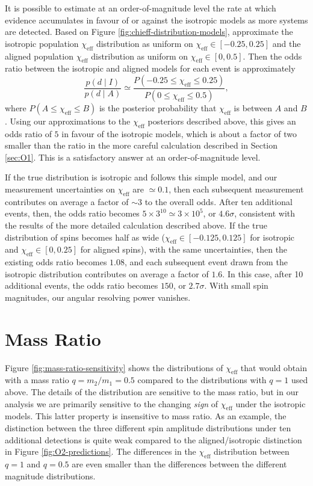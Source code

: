 \documentclass[modern,linenumbers]{aastex61}
\newcommand{\chieff}{\chi_\mathrm{eff}}
\begin{document}
It is possible to estimate at an order-of-magnitude level the rate at
which evidence accumulates in favour of or against the isotropic
models as more systems are detected.  Based on Figure
\ref{fig:chieff-distribution-models}, approximate the isotropic
population $\chieff$ distribution as uniform on
$\chieff \in \left[ -0.25, 0.25 \right]$ and the aligned population
$\chieff$ distribution as uniform on
$\chieff \in \left[0, 0.5\right]$.  Then the odds ratio between the
isotropic and aligned models for each event is approximately
\begin{equation}
  \label{eq:approx-odds}
  \frac{p\left( d \mid I \right)}{p\left( d \mid A \right)} \simeq
  \frac{P\left( -0.25 \leq \chieff \leq 0.25 \right)}{P\left( 0 \leq \chieff \leq 0.5 \right) },
\end{equation}
where $P\left( A \leq \chieff \leq B \right)$ is the posterior
probability that $\chieff$ is between $A$ and $B$.  Using our
approximations to the $\chieff$ posteriors described above, this gives
an odds ratio of $5$ in favour of the isotropic models, which is about
a factor of two smaller than the ratio in the more careful calculation
described in Section \ref{sec:O1}.  This is a satisfactory answer at
an order-of-magnitude level.

If the true distribution is isotropic and follows this simple model,
and our measurement uncertainties on $\chieff$ are $\simeq 0.1$, then
each subsequent measurement contributes on average a factor of
$\sim 3$ to the overall odds.  After ten additional events, then, the
odds ratio becomes $5 \times 3^{10} \simeq 3 \times 10^{5}$, or
$4.6 \sigma$, consistent with the results of the more detailed
calculation described above.  If the true distribution of spins
becomes half as wide ($\chieff \in [-0.125, 0.125]$ for isotropic and
$\chieff \in [0, 0.25]$ for aligned spins), with the same
uncertainties, then the existing odds ratio becomes $1.08$, and each
subsequent event drawn from the isotropic distribution contributes on
average a factor of $1.6$.  In this case, after 10 additional events,
the odds ratio becomes $150$, or $2.7\sigma$.  With small spin
magnitudes, our angular resolving power vanishes.

\section{Mass Ratio}
\label{sec:mass-ratio}

Figure \ref{fig:mass-ratio-sensitivity} shows the distributions of
$\chieff$ that would obtain with a mass ratio $q = m_2/m_1 = 0.5$
compared to the distributions with $q = 1$ used above.  The details of
the distribution are sensitive to the mass ratio, but in our analysis
we are primarily sensitive to the changing \emph{sign} of $\chieff$
under the isotropic models.  This latter property is insensitive to
mass ratio.  As an example, the distinction between the three
different spin amplitude distributions under ten additional detections
is quite weak compared to the aligned/isotropic distinction in Figure
\ref{fig:O2-predictions}.  The differences in the $\chieff$
distribution between $q = 1$ and $q = 0.5$ are even smaller than the
differences between the different magnitude distributions.
\end{document}
